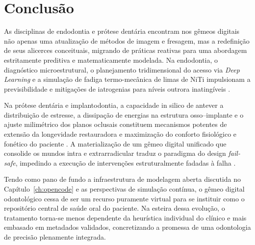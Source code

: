 \section{Conclusão}

As disciplinas de endodontia e prótese dentária encontram nos gêmeos digitais não apenas uma atualização de métodos de imagem e fresagem, mas a redefinição de seus alicerces conceituais, migrando de práticas reativas para uma abordagem estritamente preditiva e matematicamente modelada. Na endodontia, o diagnóstico microestrutural, o planejamento tridimensional do acesso via \textit{Deep Learning} e a simulação de fadiga termo-mecânica de limas de NiTi impulsionam a previsibilidade e mitigações de iatrogenias para níveis outrora inatingíveis \cite{elsaid2025digital, khoshfekr2025review}.

Na prótese dentária e implantodontia, a capacidade in silico de antever a distribuição de estresse, a dissipação de energias na estrutura osso--implante e o ajuste milimétrico dos planos oclusais constituem mecanismos potentes de extensão da longevidade restauradora e maximização do conforto fisiológico e fonético do paciente \cite{roy2025applications, olawade2026advancing}. A materialização de um gêmeo digital unificado que consolide os mundos intra e extrarradicular traduz o paradigma do design \textit{fail-safe}, impedindo a execução de intervenções estruturalmente fadadas à falha \cite{xing2024clinical}.


Tendo como pano de fundo a infraestrutura de modelagem aberta discutida no Capítulo~\ref{ch:opencode} e as perspectivas de simulação contínua, o gêmeo digital odontológico cessa de ser um recurso puramente virtual para se instituir como o repositório central de saúde oral do paciente. Na esteira dessa evolução, o tratamento torna-se menos dependente da heurística individual do clínico e mais embasado em metadados validados, concretizando a promessa de uma odontologia de precisão plenamente integrada.
